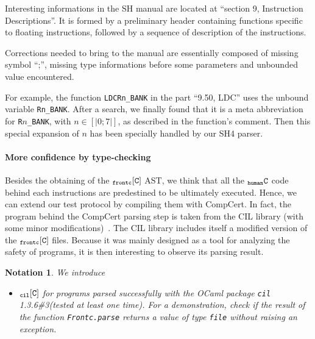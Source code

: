 \documentclass[a4paper, 11pt]{article}
\newcommand{\compcert}{CompCert 1.9\xspace}
\newcommand{\ccert}{CompCert\xspace}
\newcommand{\cilv}{1.3.6\#3\xspace}
\newcommand{\hC}{$_{\tt human}{\tt C}$\xspace}
\newcommand{\frontC}{$_{\tt frontc}{\tt [C]}$\xspace}
\newcommand{\cilC}{$_{\tt cil}{\tt [C]}$\xspace}
\newcommand{\cparserC}{$_{\tt cparser}{\tt [C]}$\xspace}
\newtheorem*{note}{Notation}
\begin{document}
Interesting informations in the SH manual are located at ``section 9, Instruction Descriptions''. It is formed by a preliminary header containing functions specific to floating instructions, followed by a sequence of description of the instructions. 

Corrections needed to bring to the manual are essentially composed of missing symbol ``;'', missing type informations before some parameters and unbounded value encountered. 

For example, the function \verb|LDCRn_BANK| in the part ``9.50, LDC'' uses the unbound variable \verb|Rn_BANK|.  After a search, we finally found that it is a meta abbreviation for \verb|R|$n$\verb|_BANK|, with $n \in [|0;7|]$, as described in the function's comment. Then this special expansion of $n$ has been specially handled by our SH4 parser.

    \paragraph{More confidence by type-checking}
Besides the obtaining of the \frontC AST, we think that all the \hC code behind each instructions are predestined to be ultimately executed. Hence, we can extend our test protocol by compiling them with \ccert.
In fact, the program behind the \ccert parsing step is taken from the CIL library (with some minor modifications)~\cite{necula}. The CIL library includes itself a modified version of the \frontC files. Because it was mainly designed as a tool for analyzing the safety of programs, it is then interesting to observe its parsing result.
\begin{note}
We introduce
\begin{itemize}
\item \cilC for programs parsed successfully with the OCaml package {\tt cil} \cilv (tested at least one time). For a demonstration, check if the result of the function \verb|Frontc.parse| returns a value of type \verb|file| without raising an exception. 
\end{itemize}
\end{note}
\end{document}
